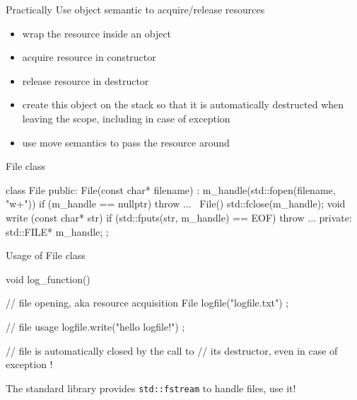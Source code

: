 \begin{frame}
  \begin{block}{Practically}
    Use object semantic to acquire/release resources
    \begin{itemize}
    \item wrap the resource inside an object
    \item acquire resource in constructor
    \item release resource in destructor
    \item create this object on the stack so that it is automatically destructed when leaving the scope, including in case of exception
    \item use move semantics to pass the resource around
    \end{itemize}
  \end{block}
\end{frame}

\begin{frame}[fragile]
  \begin{exampleblock}{File class}
    \begin{cppcode*}{}
      class File {
      public:
        File(const char* filename) :
          m_handle(std::fopen(filename, "w+")) {
          if (m_handle == nullptr) { throw ... }
        }
        ~File() { std::fclose(m_handle); }
        void write (const char* str) {
          if (std::fputs(str, m_handle) == EOF) {
            throw ...
          }
        }
      private:
        std::FILE* m_handle;
      };
    \end{cppcode*}
  \end{exampleblock}
\end{frame}

\begin{frame}[fragile]
  \begin{exampleblock}{Usage of File class}
    \begin{cppcode*}{}
      void log_function() {
        // file opening, aka resource acquisition
        File logfile("logfile.txt") ;

        // file usage
        logfile.write("hello logfile!") ;

        // file is automatically closed by the call to
        // its destructor, even in case of exception !
      }
    \end{cppcode*}
  \end{exampleblock}
  \begin{alertblock}{}
     The standard library provides \texttt{std::fstream} to handle files, use it!
  \end{alertblock}
\end{frame}

